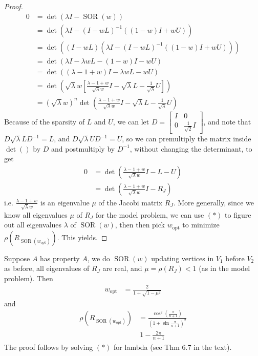 \documentclass[11pt]{article}
\numberwithin{equation}{section}
\begin{document}
\begin{theorem}
\begin{proof}
\begin{align*}
            0 &= \operatorname{det}(\lambda I - \operatorname{SOR}(w)) \\
            &= \operatorname{det}(\lambda I - (I-w L)^{-1}((1-w)I + wU)) \\
            &= \operatorname{det}((I-w L)(\lambda I - (I-w L)^{-1}((1-w)I + wU))) \\
            &= \operatorname{det}(\lambda I - \lambda w L - (1-w)I - wU) \\
            &= \operatorname{det}((\lambda-1+w) I - \lambda w L - wU) \\
            &= \operatorname{det}(\sqrt{\lambda} w [\frac{\lambda-1+w}{\sqrt{\lambda} w} I - \sqrt{\lambda} L-\frac{1}{\sqrt{\lambda}}U]) \\
            &= (\sqrt{\lambda} w)^n \operatorname{det}(\frac{\lambda-1+w}{\sqrt{\lambda} w} I - \sqrt{\lambda} L-\frac{1}{\sqrt{\lambda}}U)
        \end{align*}
        Because of the sparsity of $L$ and $U$, we can let $D=\left[\begin{array}{ll}
            I & 0 \\
            0 & \frac{1}{\sqrt{2}} I
            \end{array}\right]$,
        and note that $D \sqrt{\lambda} L D^{-1}=L$, and $D \sqrt{\lambda} U D^{-1}=U$, 
        so we can premultiply the matrix inside $\operatorname{det}()$ by $D$ and postmultiply by $D^{-1}$, without changing the determinant, to get \begin{align*}
            0 &= \operatorname{det}(\frac{\lambda-1+w}{\sqrt{\lambda} w}I - L - U) \\
            &= \operatorname{det}(\frac{\lambda-1+w}{\sqrt{\lambda} w}I - R_J)
        \end{align*}
        i.e. $\frac{\lambda-1+w}{\sqrt{\lambda} w}$ is an eigenvalue $\mu$ of the Jacobi matrix $R_J$. More generally, 
        since we know all eigenvalues $\mu$ of $R_J$ for the model problem, we can use $(*)$ to figure out all eigenvalues $\lambda$ of $\operatorname{SOR}(w)$,
        then then pick $w_{\operatorname{opt}}$ to minimize $\rho(R_{\operatorname{SOR}(w_{\operatorname{opt}})})$. This yields.
    \end{proof}
\end{theorem}

\begin{theorem}
    Suppose $A$ has property $A$, we do $\operatorname{SOR}(w)$ updating vertices in $V_1$ before $V_2$ as before, 
    all eigenvalues of $R_J$ are real, and $\mu= \rho(R_J)<1$ (as in the model problem). 
    Then \begin{align*}
        w_{\operatorname{opt}} &= \frac{2}{1+\sqrt{1-\mu^{2}}}
    \end{align*}
    and \begin{align*}
        \rho(R_{\operatorname{SOR}(w_{\operatorname{opt}})}) &= \frac{\cos ^{2}\left(\frac{\pi}{n+1}\right)}{\left(1+\sin \frac{\pi}{n+1}\right)^{2}} \\
        &~ 1 - \frac{2 \pi}{n+1}
    \end{align*}
    The proof follows by solving $(*)$ for lambda (see Thm 6.7 in the text).
\end{theorem}
\end{document}
